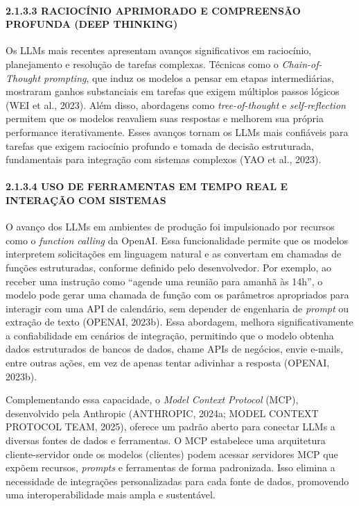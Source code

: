 \documentclass[
]{article}
\begin{document}
\paragraph{2.1.3.3 RACIOCÍNIO APRIMORADO E COMPREENSÃO PROFUNDA (DEEP
THINKING)}\label{raciocuxednio-aprimorado-e-compreensuxe3o-profunda-deep-thinking}

Os LLMs mais recentes apresentam avanços significativos em raciocínio,
planejamento e resolução de tarefas complexas. Técnicas como o
\emph{Chain-of-Thought prompting}, que induz os modelos a pensar em
etapas intermediárias, mostraram ganhos substanciais em tarefas que
exigem múltiplos passos lógicos (WEI et al., 2023). Além disso,
abordagens como \emph{tree-of-thought} e \emph{self-reflection} permitem
que os modelos reavaliem suas respostas e melhorem sua própria
performance iterativamente. Esses avanços tornam os LLMs mais confiáveis
para tarefas que exigem raciocínio profundo e tomada de decisão
estruturada, fundamentais para integração com sistemas complexos (YAO et
al., 2023).

\paragraph{2.1.3.4 USO DE FERRAMENTAS EM TEMPO REAL E INTERAÇÃO COM
SISTEMAS}\label{uso-de-ferramentas-em-tempo-real-e-interauxe7uxe3o-com-sistemas}

O avanço dos LLMs em ambientes de produção foi impulsionado por recursos
como o \emph{function calling} da OpenAI. Essa funcionalidade permite
que os modelos interpretem solicitações em linguagem natural e as
convertam em chamadas de funções estruturadas, conforme definido pelo
desenvolvedor. Por exemplo, ao receber uma instrução como ``agende uma
reunião para amanhã às 14h'', o modelo pode gerar uma chamada de função
com os parâmetros apropriados para interagir com uma API de calendário,
sem depender de engenharia de \emph{prompt} ou extração de texto
(OPENAI, 2023b). Essa abordagem, melhora significativamente a
confiabilidade em cenários de integração, permitindo que o modelo
obtenha dados estruturados de bancos de dados, chame APIs de negócios,
envie e-mails, entre outras ações, em vez de apenas tentar adivinhar a
resposta (OPENAI, 2023b).

Complementando essa capacidade, o \emph{Model Context Protocol} (MCP),
desenvolvido pela Anthropic (ANTHROPIC, 2024a; MODEL CONTEXT PROTOCOL
TEAM, 2025), oferece um padrão aberto para conectar LLMs a diversas
fontes de dados e ferramentas. O MCP estabelece uma arquitetura
cliente-servidor onde os modelos (clientes) podem acessar servidores MCP
que expõem recursos, \emph{prompts} e ferramentas de forma padronizada.
Isso elimina a necessidade de integrações personalizadas para cada fonte
de dados, promovendo uma interoperabilidade mais ampla e sustentável.
\end{document}
